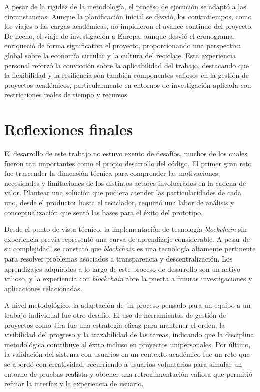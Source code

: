 A pesar de la rigidez de la metodología, el proceso de ejecución se adaptó a las circunstancias. Aunque la planificación inicial se desvió, los contratiempos, como los viajes o las cargas académicas, no impidieron el avance continuo del proyecto. De hecho, el viaje de investigación a Europa, aunque desvió el cronograma, enriqueció de forma significativa el proyecto, proporcionando una perspectiva global sobre la economía circular y la cultura del reciclaje. Esta experiencia personal reforzó la convicción sobre la aplicabilidad del trabajo, destacando que la flexibilidad y la resiliencia son también componentes valiosos en la gestión de proyectos académicos, particularmente en entornos de investigación aplicada con restricciones reales de tiempo y recursos.

\section{Reflexiones finales}

El desarrollo de este trabajo no estuvo exento de desafíos, muchos de los cuales fueron tan importantes como el propio desarrollo del código. El primer gran reto fue trascender la dimensión técnica para comprender las motivaciones, necesidades y limitaciones de los distintos actores involucrados en la cadena de valor. Plantear una solución que pudiera atender las particularidades de cada uno, desde el productor hasta el reciclador, requirió una labor de análisis y conceptualización que sentó las bases para el éxito del prototipo.

Desde el punto de vista técnico, la implementación de tecnología \textit{blockchain} sin experiencia previa representó una curva de aprendizaje considerable. A pesar de su complejidad, se constató que \textit{blockchain} es una tecnología altamente pertinente para resolver problemas asociados a transparencia y descentralización. Los aprendizajes adquiridos a lo largo de este proceso de desarrollo son un activo valioso, y la experiencia con \textit{blockchain} abre la puerta a futuras investigaciones y aplicaciones relacionadas.

A nivel metodológico, la adaptación de un proceso pensado para un equipo a un trabajo individual fue otro desafío. El uso de herramientas de gestión de proyectos como Jira fue una estrategia eficaz para mantener el orden, la visibilidad del progreso y la trazabilidad de las tareas, indicando que la disciplina metodológica contribuye al éxito incluso en proyectos unipersonales. Por último, la validación del sistema con usuarios en un contexto académico fue un reto que se abordó con creatividad, recurriendo a usuarios voluntarios para simular un entorno de pruebas realista y obtener una retroalimentación valiosa que permitió refinar la interfaz y la experiencia de usuario.

